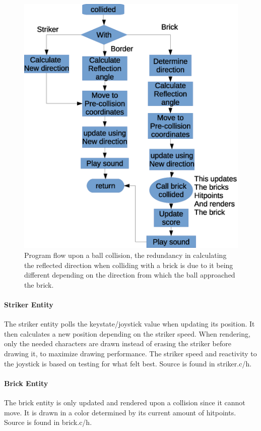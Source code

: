 \begin{figure}
	\center
	\includegraphics[scale=0.5]{pictures/ball_flow.eps}
	\caption{Program flow upon a ball collision, the redundancy in calculating the reflected
	direction when colliding with a brick is due to it being different depending on the direction
	from which the ball approached the brick.}
	\label{ball_flow}
\end{figure}

\paragraph{Striker Entity}
The striker entity polls the keystate/joystick value when updating its position. It then 
calculates a new position depending on the striker speed. When rendering, only the needed
characters are drawn instead of erasing the striker before drawing it, to maximize drawing
performance. The striker speed and reactivity to the joystick is based on testing for
what felt best. Source is found in striker.c/h.

\paragraph{Brick Entity}
The brick entity is only updated and rendered upon a collision since it cannot move. It is
drawn in a color determined by its current amount of hitpoints. Source is found in brick.c/h.

